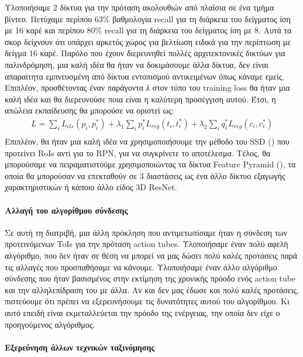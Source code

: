Υλοποιήσαμε 2 δίκτυα για την πρόταση ακολουθιών από πλαίσια σε ένα τμήμα βίντεο. Πετύχαμε περίπου 63\% βαθμολογία \en recall \gr
για τη διάρκεια του δείγματος ίση με 16 καρέ και περίπου 80\% \en recall \gr για τη διάρκεια του δείγματος ίση με 8. Αυτά τα σκορ 
δείχνουν ότι υπάρχει αρκετός χώρος για βελτίωση ειδικά για την περίπτωση με δείγμα 16 καρέ.
Παρόλο που έχουν διερευνηθεί πολλές αρχιτεκτονικές δικτύων για
παλινδρόμηση, μια καλή ιδέα θα ήταν να δοκιμάσουμε άλλα δίκτυα, δεν είναι απαραίτητα εμπνευσμένη
από δίκτυα εντοπισμού αντικειμένων όπως κάναμε εμείς. 
Επιπλέον, προσθέτοντας έναν παράγοντα \textit{λ} στον τύπο του \en training loss \gr
 θα ήταν μια καλή ιδέα και θα διερευνούσε ποια είναι η καλύτερη προσέγγιση αυτού.
Έτσι, η απώλεια εκπαίδευσης θα μπορούσε να οριστεί ως:
\begin{equation} 
\begin{split}
 L  =  \sum_iL_{cls}(p_i, p_i^*) + \lambda_1 \sum_ip_i^*L_{reg}(t_i,t_i^*) + \lambda_2  \sum_iq_i^*L_{reg}(c_{i}, c_{i}^*) \\
\end{split}
\end{equation}
Επιπλέον, θα ήταν μια καλή ιδέα να χρησιμοποιήσουμε την μέθοδο του \en SSD  (\cite{DBLP:journals/corr/LiuAESR15}) \gr που προτείνει \en RoIs \gr 
αντί για το \en RPN\gr, για να συγκρίνετε το αποτέλεσμα.  Τέλος, θα μπορούσαμε να πειραματιστούμε χρησιμοποιώντας τα δίκτυα \en Feature Pyramid (\cite{8099589}), \gr
τα οποία θα μπορούσαν να επεκταθούν σε 3 διαστάσεις ως ένα άλλο δίκτυο εξαγωγής χαρακτηριστικών ή κάποιο άλλο είδος \en 3D ResNet\gr.

\paragraph{Αλλαγή του αλγορίθμου σύνδεσης}
Σε αυτή τη διατριβή, μια άλλη πρόκληση που αντιμετωπίσαμε ήταν η σύνδεση των προτεινόμενων \en ToIs \gr για την πρόταση \en action tubes\gr. Υλοποιήσαμε έναν πολύ αφελή αλγόριθμο,
που δεν ήταν σε θέση να μπορεί να μας δώσει πολύ καλές προτάσεις παρά τις αλλαγές που προσπαθήσαμε να κάνουμε. Υλοποιήσαμε έναν άλλο αλγόριθμο σύνδεσης που ήταν βασισμένος στην εκτίμηση της χρονικής
πρόοδο ενός \en action tube \gr και την αλληλεπίδραση του με άλλα. Αν και δεν μας έδωσε και πολύ καλές προτάσεις, πιστεύουμε ότι πρέπει να εξερευνήσουμε τις δυνατότητες αυτού του αλγορίθμου. Κι αυτό 
επειδή είναι  εκμεταλλεύεται την πρόοδο της ενέργειας, την οποία δεν είχε ο προηγούμενος αλγόριθμος.

\paragraph{Εξερεύνηση άλλων τεχνικών ταξινόμησης}

